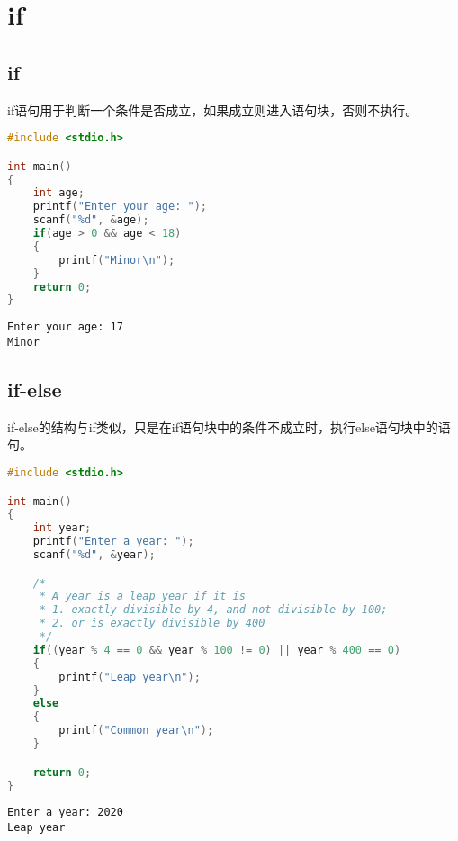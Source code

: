 \newpage

\section{if}

\subsection{if}

if语句用于判断一个条件是否成立，如果成立则进入语句块，否则不执行。\\


\begin{lstlisting}[language=C]
#include <stdio.h>

int main()
{
	int age;
	printf("Enter your age: ");
	scanf("%d", &age);
	if(age > 0 && age < 18)
	{
		printf("Minor\n");
	}
	return 0;
}
\end{lstlisting}

\begin{tcolorbox}
	\begin{verbatim}
Enter your age: 17
Minor
\end{verbatim}
\end{tcolorbox}

\vspace{0.5cm}

\subsection{if-else}

if-else的结构与if类似，只是在if语句块中的条件不成立时，执行else语句块中的语句。\\


\begin{lstlisting}[language=C]
#include <stdio.h>

int main()
{
	int year;
	printf("Enter a year: ");
	scanf("%d", &year);

	/*
	 * A year is a leap year if it is
	 * 1. exactly divisible by 4, and not divisible by 100;
	 * 2. or is exactly divisible by 400
	 */
	if((year % 4 == 0 && year % 100 != 0) || year % 400 == 0)
	{
		printf("Leap year\n");
	}
	else
	{
		printf("Common year\n");
	}

	return 0;
}
\end{lstlisting}

\begin{tcolorbox}
	\begin{verbatim}
Enter a year: 2020
Leap year
\end{verbatim}
\end{tcolorbox}

